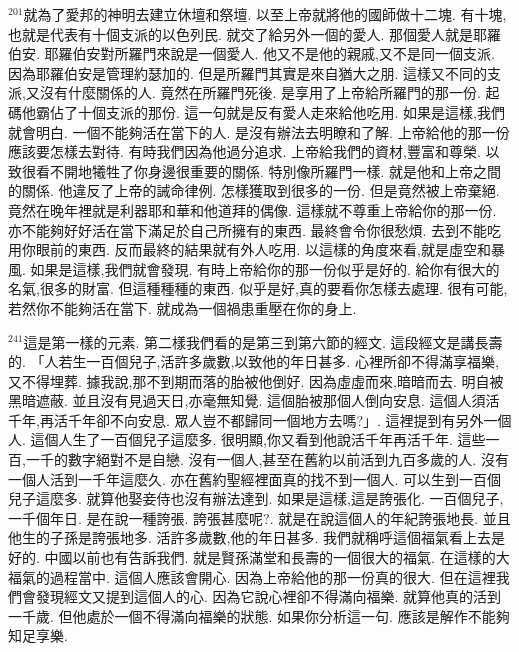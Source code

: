 \documentclass{book}
\begin{document}
$^{201}$就為了愛邦的神明去建立休壇和祭壇.
以至上帝就將他的國師做十二塊.
有十塊,也就是代表有十個支派的以色列民.
就交了給另外一個的愛人.
那個愛人就是耶羅伯安.
耶羅伯安對所羅門來說是一個愛人.
他又不是他的親戚,又不是同一個支派.
因為耶羅伯安是管理約瑟加的.
但是所羅門其實是來自猶大之朋.
這樣又不同的支派,又沒有什麼關係的人.
竟然在所羅門死後.
是享用了上帝給所羅門的那一份.
起碼他霸佔了十個支派的那份.
這一句就是反有愛人走來給他吃用.
如果是這樣,我們就會明白.
一個不能夠活在當下的人.
是沒有辦法去明瞭和了解.
上帝給他的那一份應該要怎樣去對待.
有時我們因為他過分追求.
上帝給我們的資材,豐富和尊榮.
以致很看不開地犧牲了你身邊很重要的關係.
特別像所羅門一樣.
就是他和上帝之間的關係.
他違反了上帝的誡命律例.
怎樣獲取到很多的一份.
但是竟然被上帝棄絕.
竟然在晚年裡就是利器耶和華和他道拜的偶像.
這樣就不尊重上帝給你的那一份.
亦不能夠好好活在當下滿足於自己所擁有的東西.
最終會令你很愁煩.
去到不能吃用你眼前的東西.
反而最終的結果就有外人吃用.
以這樣的角度來看,就是虛空和暴風.
如果是這樣,我們就會發現.
有時上帝給你的那一份似乎是好的.
給你有很大的名氣,很多的財富.
但這種種種的東西.
似乎是好,真的要看你怎樣去處理.
很有可能,若然你不能夠活在當下.
就成為一個禍患重壓在你的身上.

$^{241}$這是第一樣的元素.
第二樣我們看的是第三到第六節的經文.
這段經文是講長壽的.
「人若生一百個兒子,活許多歲數,以致他的年日甚多.
心裡所卻不得滿享福樂,又不得埋葬.
據我說,那不到期而落的胎被他倒好.
因為虛虛而來,暗暗而去.
明自被黑暗遮蔽.
並且沒有見過天日,亦毫無知覺.
這個胎被那個人倒向安息.
這個人須活千年,再活千年卻不向安息.
眾人豈不都歸同一個地方去嗎?」.
這裡提到有另外一個人.
這個人生了一百個兒子這麼多.
很明顯,你又看到他說活千年再活千年.
這些一百,一千的數字絕對不是自戀.
沒有一個人,甚至在舊約以前活到九百多歲的人.
沒有一個人活到一千年這麼久.
亦在舊約聖經裡面真的找不到一個人.
可以生到一百個兒子這麼多.
就算他娶妾侍也沒有辦法達到.
如果是這樣,這是誇張化.
一百個兒子,一千個年日.
是在說一種誇張.
誇張甚麼呢?.
就是在說這個人的年紀誇張地長.
並且他生的子孫是誇張地多.
活許多歲數,他的年日甚多.
我們就稱呼這個福氣看上去是好的.
中國以前也有告訴我們.
就是賢孫滿堂和長壽的一個很大的福氣.
在這樣的大福氣的過程當中.
這個人應該會開心.
因為上帝給他的那一份真的很大.
但在這裡我們會發現經文又提到這個人的心.
因為它說心裡卻不得滿向福樂.
就算他真的活到一千歲.
但他處於一個不得滿向福樂的狀態.
如果你分析這一句.
應該是解作不能夠知足享樂.
\end{document}
